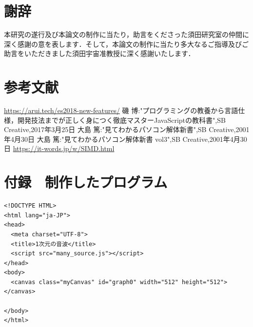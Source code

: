 \documentclass[a4j,12pt]{jsarticle}
\begin{document}
\section{謝辞}
本研究の遂行及び本論文の制作に当たり，助言をくださった須田研究室の仲間に深く感謝の意を表します．そして，本論文の制作に当たり多大なるご指導及びご助言をいただきました須田宇宙准教授に深く感謝いたします．
\newpage

\section{参考文献}
\begin{thebibliography}{99}
\url{https://arui.tech/es2018-new-features/}
磯 博:"プログラミングの教養から言語仕様，開発技法までが正しく身につく徹底マスターJavaScriptの教科書",SB Creative,2017年3月25日
大島 篤:"見てわかるパソコン解体新書",SB Creative,2001年4月30日
大島 篤:"見てわかるパソコン解体新書 vol3",SB Creative,2001年4月30日
\url{https://it-words.jp/w/SIMD.html}
\end{thebibliography}
\newpage

\setcounter{page}{1} 
\section{付録　制作したプログラム}

\lstset{
    numbers=left,
    tabsize=2
}
\begin{lstlisting}
<!DOCTYPE HTML>
<html lang="ja-JP">
<head>
  <meta charset="UTF-8">
  <title>1次元の音波</title>
  <script src="many_source.js"></script>
</head>
<body>
  <canvas class="myCanvas" id="graph0" width="512" height="512"></canvas>

</body>
</html>

\end{lstlisting}
\newpage
\end{document}
